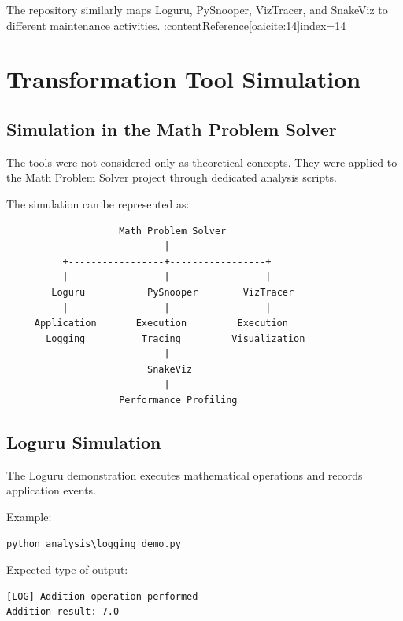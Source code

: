 \documentclass[12pt,a4paper]{report}
\begin{document}
The repository similarly maps Loguru, PySnooper, VizTracer, and SnakeViz
to different maintenance activities. :contentReference[oaicite:14]{index=14}


\chapter{Transformation Tool Simulation}

\section{Simulation in the Math Problem Solver}

The tools were not considered only as theoretical concepts. They were
applied to the Math Problem Solver project through dedicated analysis
scripts.

The simulation can be represented as:

\begin{lstlisting}
                    Math Problem Solver
                            |
          +-----------------+-----------------+
          |                 |                 |
        Loguru           PySnooper        VizTracer
          |                 |                 |
     Application       Execution         Execution
       Logging          Tracing         Visualization
                            |
                         SnakeViz
                            |
                    Performance Profiling
\end{lstlisting}

\section{Loguru Simulation}

The Loguru demonstration executes mathematical operations and records
application events.

Example:

\begin{lstlisting}
python analysis\logging_demo.py
\end{lstlisting}

Expected type of output:

\begin{lstlisting}
[LOG] Addition operation performed
Addition result: 7.0
\end{lstlisting}
\end{document}
